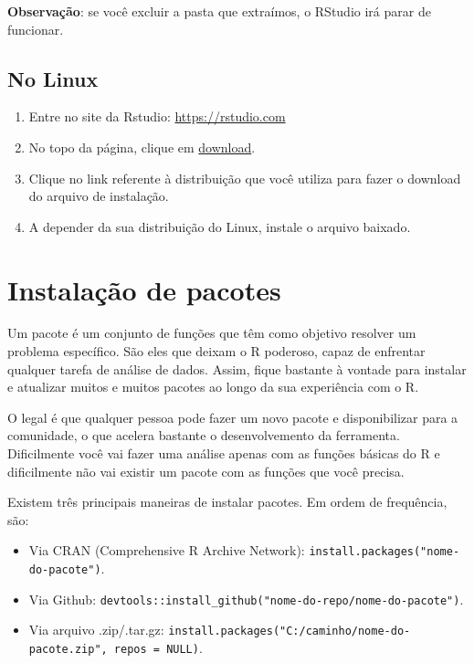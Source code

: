 \documentclass[]{book}
\providecommand{\tightlist}{%
  \setlength{\itemsep}{0pt}\setlength{\parskip}{0pt}}
\begin{document}
\textbf{Observação}: se você excluir a pasta que extraímos, o RStudio irá parar de funcionar.

\hypertarget{no-linux-1}{%
\subsection{No Linux}\label{no-linux-1}}

\begin{enumerate}
\def\labelenumi{\arabic{enumi}.}
\item
  Entre no site da Rstudio: \url{https://rstudio.com}
\item
  No topo da página, clique em \href{https://rstudio.com/products/rstudio/download/}{download}.
\item
  Clique no link referente à distribuição que você utiliza para fazer o download do arquivo de instalação.
\item
  A depender da sua distribuição do Linux, instale o arquivo baixado.
\end{enumerate}

\hypertarget{instalauxe7uxe3o-de-pacotes}{%
\section{Instalação de pacotes}\label{instalauxe7uxe3o-de-pacotes}}

Um pacote é um conjunto de funções que têm como objetivo resolver um problema específico. São eles que deixam o R poderoso, capaz de enfrentar qualquer tarefa de análise de dados. Assim, fique bastante à vontade para instalar e atualizar muitos e muitos pacotes ao longo da sua experiência com o R.

O legal é que qualquer pessoa pode fazer um novo pacote e disponibilizar para a comunidade, o que acelera bastante o desenvolvemento da ferramenta. Dificilmente você vai fazer uma análise apenas com as funções básicas do R e dificilmente não vai existir um pacote com as funções que você precisa.

Existem três principais maneiras de instalar pacotes. Em ordem de frequência, são:

\begin{itemize}
\tightlist
\item
  Via CRAN (Comprehensive R Archive Network): \texttt{install.packages("nome-do-pacote")}.
\item
  Via Github: \texttt{devtools::install\_github("nome-do-repo/nome-do-pacote")}.
\item
  Via arquivo .zip/.tar.gz: \texttt{install.packages("C:/caminho/nome-do-pacote.zip",\ repos\ =\ NULL)}.
\end{itemize}
\end{document}
